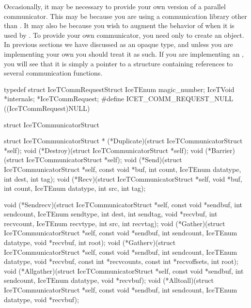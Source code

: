 Occasionally, it may be necessary to provide your own version of a parallel
communicator.  This may be because you are using a communication library
other than \MPI.  It may also be because you wish to augment the behavior
of \MPI when it is used by \IceT.  To provide your own communicator, you
need only to create an  object.  In previous
sections we have discussed  as an opaque type, and
unless you are implementing your own you should treat it as such.  If you
are implementing an , you will see that it is simply
a pointer to a structure containing references to several communication
functions.

\begin{code}
typedef struct IceTCommRequestStruct {
    IceTEnum magic_number;
    IceTVoid *internals;
} *IceTCommRequest;
#define ICET_COMM_REQUEST_NULL ((IceTCommRequest)NULL)

struct IceTCommunicatorStruct {
    struct IceTCommunicatorStruct *
         (*Duplicate)(struct IceTCommunicatorStruct *self);
    void (*Destroy)(struct IceTCommunicatorStruct *self);
    void (*Barrier)(struct IceTCommunicatorStruct *self);
    void (*Send)(struct IceTCommunicatorStruct *self,
                 const void *buf,
                 int count,
                 IceTEnum datatype,
                 int dest,
                 int tag);
    void (*Recv)(struct IceTCommunicatorStruct *self,
                 void *buf,
                 int count,
                 IceTEnum datatype,
                 int src,
                 int tag);

    void (*Sendrecv)(struct IceTCommunicatorStruct *self,
                     const void *sendbuf,
                     int sendcount,
                     IceTEnum sendtype,
                     int dest,
                     int sendtag,
                     void *recvbuf,
                     int recvcount,
                     IceTEnum recvtype,
                     int src,
                     int recvtag);
    void (*Gather)(struct IceTCommunicatorStruct *self,
                   const void *sendbuf,
                   int sendcount,
                   IceTEnum datatype,
                   void *recvbuf,
                   int root);
    void (*Gatherv)(struct IceTCommunicatorStruct *self,
                    const void *sendbuf,
                    int sendcount,
                    IceTEnum datatype,
                    void *recvbuf, 
                    const int *recvcounts,
                    const int *recvoffsets,
                    int root);
    void (*Allgather)(struct IceTCommunicatorStruct *self,
                      const void *sendbuf,
                      int sendcount,
                      IceTEnum datatype,
                      void *recvbuf);
    void (*Alltoall)(struct IceTCommunicatorStruct *self,
                     const void *sendbuf,
                     int sendcount,
                     IceTEnum datatype,
                     void *recvbuf);

}
\end{code}

